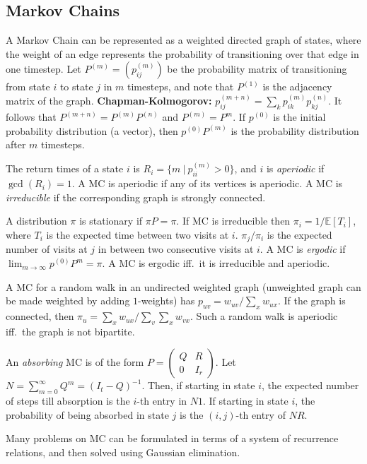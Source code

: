 \documentclass[13pt,a4paper]{article}
\begin{document}
\begin{landscape}
\begin{multicols*}{3}
\subsection{Markov Chains}
A Markov Chain can be represented as a weighted directed graph of
states, where the weight of an edge represents the probability of
transitioning over that edge in one timestep. Let $P^{(m)} = (p^{(m)}_{ij})$
be the probability matrix of transitioning from state $i$ to state $j$
in $m$ timesteps, and note that $P^{(1)}$ is the adjacency matrix of
the graph. \textbf{Chapman-Kolmogorov:} $p^{(m+n)}_{ij} = \sum_{k}
p^{(m)}_{ik} p^{(n)}_{kj}$. It follows that $P^{(m+n)} =
P^{(m)}P^{(n)}$ and $P^{(m)} = P^m$. If $p^{(0)}$ is the initial
probability distribution (a vector), then $p^{(0)}P^{(m)}$ is the
probability distribution after $m$ timesteps.

The return times of a state $i$ is $R_i = \{m\ |\ p^{(m)}_{ii} > 0 \}$,
and $i$ is \textit{aperiodic} if $\gcd(R_i) = 1$. A MC is aperiodic if
any of its vertices is aperiodic. A MC is \textit{irreducible} if the
corresponding graph is strongly connected.

A distribution $\pi$ is stationary if $\pi P = \pi$. If MC is
irreducible then $\pi_i = 1/\mathbb{E}[T_i]$, where $T_i$ is the
expected time between two visits at $i$. $\pi_j/\pi_i$ is the expected
number of visits at $j$ in between two consecutive visits at $i$. A MC
is \textit{ergodic} if $\lim_{m\to\infty} p^{(0)} P^{m} = \pi$. A MC is
ergodic iff.\ it is irreducible and aperiodic.

A MC for a random walk in an undirected weighted graph (unweighted
graph can be made weighted by adding $1$-weights) has $p_{uv} =
w_{uv}/\sum_{x} w_{ux}$. If the graph is connected, then $\pi_u =
\sum_{x} w_{ux} / \sum_{v}\sum_{x} w_{vx}$. Such a random walk is
aperiodic iff.\ the graph is not bipartite.

An \textit{absorbing} MC is of the form $P = \left(\begin{matrix} Q & R
\\ 0 & I_r \end{matrix}\right)$. Let $N = \sum_{m=0}^\infty Q^m = (I_t
- Q)^{-1}$. Then, if starting in state $i$, the expected number of
steps till absorption is the $i$-th entry in $N1$. If starting in state
$i$, the probability of being absorbed in state $j$ is the $(i,j)$-th
entry of $NR$.

Many problems on MC can be formulated in terms of a system of
recurrence relations, and then solved using Gaussian elimination.


\end{multicols*}
\end{landscape}
\end{document}
